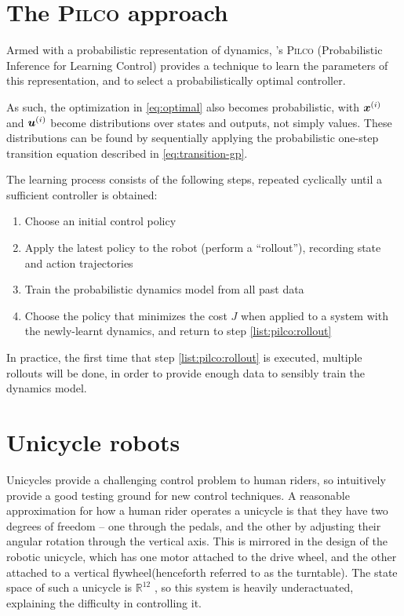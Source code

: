 \documentclass[main.tex]{subfiles}
\begin{document}
\section{The \textsc{Pilco} approach}

	Armed with a probabilistic representation of dynamics, \citeauthor{pilco}'s \textsc{Pilco} \cite{pilco} (Probabilistic Inference for Learning Control) provides a technique to learn the parameters of this representation, and to select a probabilistically optimal controller.

	As such, the optimization in \cref{eq:optimal} also becomes probabilistic\footnotemark, with $\bm{x}^{(i)}$ and $\bm{u}^{(i)}$ become distributions over states and outputs, not simply values. These distributions can be found by sequentially applying the probabilistic one-step transition equation described in \cref{eq:transition-gp}.


	The learning process consists of the following steps, repeated cyclically until a sufficient controller is obtained:
	\begin{enumerate}[nosep]
		\item Choose an initial control policy
		\item Apply the latest policy to the robot (perform a \enquote{rollout}), recording state and action trajectories \label{list:pilco:rollout}
		\item Train the probabilistic dynamics model from all past data
		\item Choose the policy that minimizes the cost $J$ when applied to a system with the newly-learnt dynamics, and return to step \ref{list:pilco:rollout}
	\end{enumerate}
	In practice, the first time that step \ref{list:pilco:rollout} is executed, multiple rollouts will be done, in order to provide enough data to sensibly train the dynamics model.

\section{Unicycle robots}

	Unicycles provide a challenging control problem to human riders, so intuitively provide a good testing ground for new control techniques.
	A reasonable approximation for how a human rider operates a unicycle is that they have two degrees of freedom -- one through the pedals, and the other by adjusting their angular rotation through the vertical axis.
	This is mirrored in the design of the robotic unicycle, which has one motor attached to the drive wheel, and the other attached to a vertical flywheel\footnotemark (henceforth referred to as the turntable).
	The state space of such a unicycle is $\mathbb{R}^{12}$ \cite{forster}, so this system is heavily underactuated, explaining the difficulty in controlling it.
\end{document}
